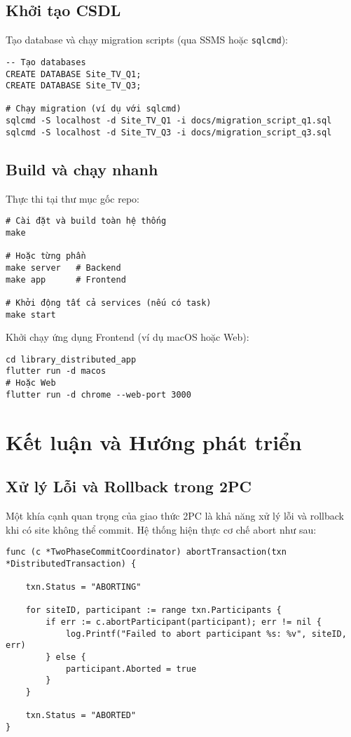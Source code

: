 \documentclass[conference]{IEEEtran}
\begin{document}
\subsection{Khởi tạo CSDL}
Tạo database và chạy migration scripts (qua SSMS hoặc \texttt{sqlcmd}):

\begin{Verbatim}[fontsize=\footnotesize,breaklines=true,breakanywhere=true]
-- Tạo databases
CREATE DATABASE Site_TV_Q1;
CREATE DATABASE Site_TV_Q3;

# Chạy migration (ví dụ với sqlcmd)
sqlcmd -S localhost -d Site_TV_Q1 -i docs/migration_script_q1.sql
sqlcmd -S localhost -d Site_TV_Q3 -i docs/migration_script_q3.sql
\end{Verbatim}

\subsection{Build và chạy nhanh}
Thực thi tại thư mục gốc repo:

\begin{Verbatim}[fontsize=\footnotesize,breaklines=true,breakanywhere=true]
# Cài đặt và build toàn hệ thống
make

# Hoặc từng phần
make server   # Backend
make app      # Frontend

# Khởi động tất cả services (nếu có task)
make start
\end{Verbatim}

Khởi chạy ứng dụng Frontend (ví dụ macOS hoặc Web):

\begin{Verbatim}[fontsize=\footnotesize,breaklines=true,breakanywhere=true]
cd library_distributed_app
flutter run -d macos
# Hoặc Web
flutter run -d chrome --web-port 3000
\end{Verbatim}

\section{Kết luận và Hướng phát triển}
\subsection{Xử lý Lỗi và Rollback trong 2PC}
Một khía cạnh quan trọng của giao thức 2PC là khả năng xử lý lỗi và rollback khi có site không thể commit. Hệ thống hiện thực cơ chế abort như sau:

\begin{Verbatim}[fontsize=\footnotesize,breaklines=true,breakanywhere=true]
func (c *TwoPhaseCommitCoordinator) abortTransaction(txn *DistributedTransaction) {
    
    txn.Status = "ABORTING"
    
    for siteID, participant := range txn.Participants {
        if err := c.abortParticipant(participant); err != nil {
            log.Printf("Failed to abort participant %s: %v", siteID, err)
        } else {
            participant.Aborted = true
        }
    }
    
    txn.Status = "ABORTED"
}
\end{Verbatim}
\end{document}
